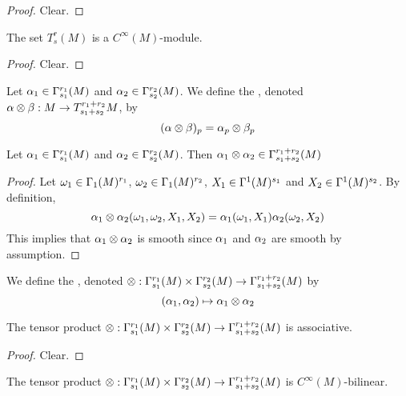\documentclass{book}
\begin{document}
	\begin{proof}
	Clear.
	\end{proof}
	
	\begin{ex}
	The set $T^r_s(M)$ is a $C^{\infty}(M)$-module.
	\end{ex}
	
	\begin{proof}
	Clear.
	\end{proof}
	
	\begin{defn}
	Let $\alpha_1 \in \Gamma^{r_1}_{s_1}(M)$ and $\alpha_2 \in \Gamma^{r_2}_{s_2}(M)$. We define the , denoted $\alpha \otimes \beta : M \rightarrow T^{r_1 + r_2}_{s_1 + s_2}M$, by $$(\alpha \otimes \beta)_p = \alpha_p \otimes \beta_p$$
	\end{defn}
	
	\begin{ex}
	Let $\alpha_1 \in \Gamma^{r_1}_{s_1}(M)$ and $\alpha_2 \in \Gamma^{r_2}_{s_2}(M)$. Then $\alpha_1 \otimes \alpha_2 \in \Gamma^{r_1 + r_2}_{s_1 + s_2}(M)$
	\end{ex}
	
	\begin{proof}
	Let $\omega_1 \in \Gamma_1(M)^{r_1}$, $\omega_2 \in \Gamma_1(M)^{r_2}$, $X_1 \in \Gamma^1(M)^{s_1}$ and $X_2 \in \Gamma^1(M)^{s_2}$. By definition,
	$$\alpha_1 \otimes \alpha_2 (\omega_1, \omega_2, X_1, X_2) = \alpha_1(\omega_1, X_1) \alpha_2(\omega_2, X_2)$$
	This implies that $\alpha_1 \otimes \alpha_2$ is smooth since $\alpha_1$ and $\alpha_2$ are smooth by assumption.
	\end{proof}
	
	\begin{defn}
	We define the , denoted $\otimes : \Gamma^{r_1}_{s_1}(M) \times \Gamma^{r_2}_{s_2}(M) \rightarrow \Gamma^{r_1+r_2}_{s_1+s_2}(M)$ by $$(\alpha_1, \alpha_2) \mapsto \alpha_1 \otimes \alpha_2 $$
	\end{defn}	
	
	\begin{ex}
	The tensor product $\otimes : \Gamma^{r_1}_{s_1}(M) \times \Gamma^{r_2}_{s_2}(M) \rightarrow \Gamma^{r_1+r_2}_{s_1+s_2}(M)$ is associative.
	\end{ex}
	
	\begin{proof}
	Clear.
	\end{proof}
	
	\begin{ex}
	The tensor product $\otimes : \Gamma^{r_1}_{s_1}(M) \times \Gamma^{r_2}_{s_2}(M) \rightarrow \Gamma^{r_1+r_2}_{s_1+s_2}(M)$ is $C^{\infty}(M)$-bilinear.
	\end{ex}
	
\end{document}
